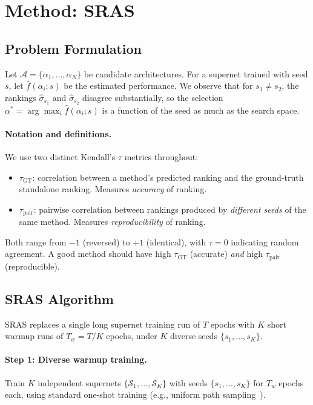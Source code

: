 \documentclass[10pt,twocolumn,letterpaper]{article}
\newcommand{\method}{SRAS}
\newcommand{\taugt}{\ensuremath{\tau_{\text{GT}}}}
\newcommand{\taupair}{\ensuremath{\tau_{\text{pair}}}}
\begin{document}
\section{Method: \method{}}
\label{sec:method}

\subsection{Problem Formulation}
\label{sec:problem}

Let $\mathcal{A} = \{\alpha_1, \ldots, \alpha_N\}$ be candidate architectures. For a supernet trained with seed $s$, let $\hat{f}(\alpha_i; s)$ be the estimated performance. We observe that for $s_1 \neq s_2$, the rankings $\hat{\sigma}_{s_1}$ and $\hat{\sigma}_{s_2}$ disagree substantially, so the selection $\alpha^* = \arg\max_i \hat{f}(\alpha_i; s)$ is a function of the seed as much as the search space.

\paragraph{Notation and definitions.}
We use two distinct Kendall's $\tau$ metrics throughout:
\begin{itemize}
    \item $\taugt$: correlation between a method's predicted ranking and the ground-truth standalone ranking. Measures \textit{accuracy} of ranking.
    \item $\taupair$: pairwise correlation between rankings produced by \textit{different seeds} of the same method. Measures \textit{reproducibility} of ranking.
\end{itemize}
Both range from $-1$ (reversed) to $+1$ (identical), with $\tau = 0$ indicating random agreement. A good method should have high $\taugt$ (accurate) \textit{and} high $\taupair$ (reproducible).

\subsection{\method{} Algorithm}
\label{sec:algorithm}

\method{} replaces a single long supernet training run of $T$ epochs with $K$ short warmup runs of $T_w = T/K$ epochs, under $K$ diverse seeds $\{s_1, \ldots, s_K\}$.

\paragraph{Step 1: Diverse warmup training.} Train $K$ independent supernets $\{\mathcal{S}_1, \ldots, \mathcal{S}_K\}$ with seeds $\{s_1, \ldots, s_K\}$ for $T_w$ epochs each, using standard one-shot training (e.g., uniform path sampling~\cite{guo2020spos}).
\end{document}
